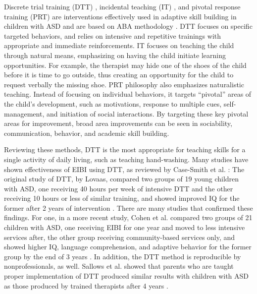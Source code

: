 \documentclass{ut-thesis}
\begin{document}
Discrete trial training (DTT) \cite{howard2005comparison}, incidental teaching (IT) \cite{mcgee1986extension}, and pivotal response training (PRT) \cite{koegel2003teaching} are interventions effectively used in adaptive skill building in children with ASD and are based on ABA methodology \cite{palmen2013behavioral}.  DTT focuses on specific targeted behaviors, and relies on intensive and repetitive trainings with appropriate and immediate reinforcements.  IT focuses on teaching the child through natural means, emphasizing on having the child initiate learning opportunities.  For example, the therapist may hide one of the shoes of the child before it is time to go outside, thus creating an opportunity for the child to request verbally the missing shoe.  PRT philosophy also emphasizes naturalistic teaching.  Instead of focusing on individual behaviors, it targets ``pivotal'' areas of the child's development, such as motivations, response to multiple cues, self-management, and initiation of social interactions.  By targeting these key pivotal areas for improvement, broad area improvements can be seen in sociability, communication, behavior, and academic skill building.

Reviewing these methods, DTT is the most appropriate for teaching skills for a single activity of daily living, such as teaching hand-washing.  Many studies have shown effectiveness of EIBI using DTT, as reviewed by Case-Smith et al. \cite{case2008evidence}: The original study of DTT, by Lovaas, compared two groups of 19 young children with ASD, one receiving 40 hours per week of intensive DTT and the other receiving 10 hours or less of similar training, and showed improved IQ for the former after 2 years of intervention \cite{lovaas1987behavioral}.  There are many studies that confirmed these findings.  For one, in a more recent study, Cohen et al. compared two groups of 21 children with ASD, one receiving EIBI for one year and moved to less intensive services after, the other group receiving community-based services only, and showed higher IQ, language comprehension, and adaptive behavior for the former group by the end of 3 years \cite{cohen2006early}.  In addition, the DTT method is reproducible by nonprofessionals, as well.  Sallows et al. showed that parents who are taught proper implementation of DTT produced similar results with children with ASD as those produced by trained therapists after 4 years \cite{sallows2005intensive}.
\end{document}
